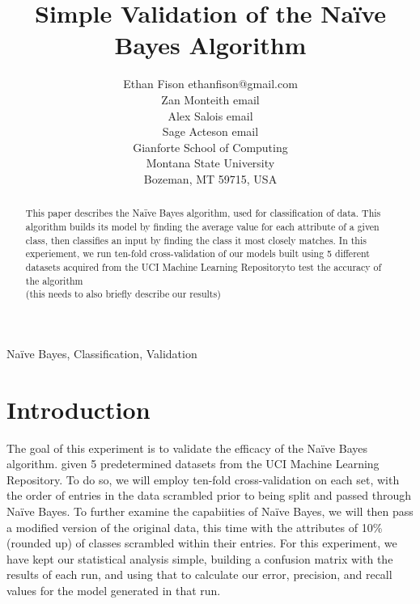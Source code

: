 \documentclass[twoside,11pt]{article}
\begin{document}
\title{Simple Validation of the Naïve Bayes Algorithm}

\author{\name Ethan Fison \email ethanfison@gmail.com \\
        \name Zan Monteith \email email \\
        \name Alex Salois \email email \\ 
        \name Sage Acteson \email email \\ 
       \addr Gianforte School of Computing\\
       Montana State University\\
       Bozeman, MT 59715, USA}



\maketitle

\begin{abstract}%
This paper describes the Na{\"i}ve Bayes algorithm, used for classification
of data. This algorithm builds its model by finding the average value for each
attribute of a given class, then classifies an input by finding the class it 
most closely matches. In this experiement, we run ten-fold cross-validation 
of our models built using 5 different datasets acquired from the UCI Machine 
Learning Repositoryto test the accuracy of the algorithm\\
(this needs to also briefly describe our results)

\end{abstract}

\begin{keywords}
  Na{\"i}ve Bayes, Classification, Validation
\end{keywords}

\section{Introduction}

The goal of this experiment is to validate the efficacy of the Naïve Bayes 
algorithm. given 5 predetermined datasets from the UCI Machine Learning Repository.\citep{Cancer,Glass,Iris,Soybean,Vote}
To do so, we will employ ten-fold cross-validation on each set, with the order of 
entries in the data scrambled prior to being split and passed through Naïve Bayes.
To further examine the capabiities of Naïve Bayes, we will then pass a modified 
version of the original data, this time with the attributes of 10\% (rounded up) of 
classes scrambled within their entries. For this experiment, we have kept our 
statistical analysis simple, building a confusion matrix with the results of each run,
and using that to calculate our error, \citep{Project, Precision} precision, and recall values for the model 
generated in that run.\\
\end{document}
